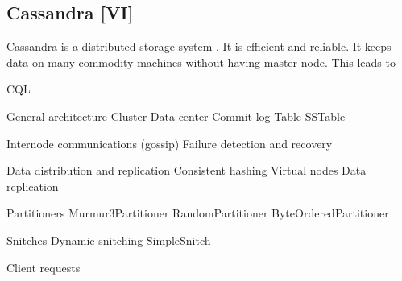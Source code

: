\subsection{Cassandra [VI]}

Cassandra is a distributed storage system \cite{Cassandra, Avinash2014, Hewitt2011}.
It is efficient and reliable.
It keeps data on many commodity machines without having master node.
This leads to

CQL

General architecture
Cluster
Data center
Commit log
Table
SSTable

Internode communications (gossip)
Failure detection and recovery

Data distribution and replication
Consistent hashing
Virtual nodes
Data replication

Partitioners
Murmur3Partitioner
RandomPartitioner
ByteOrderedPartitioner

Snitches
Dynamic snitching
SimpleSnitch

Client requests